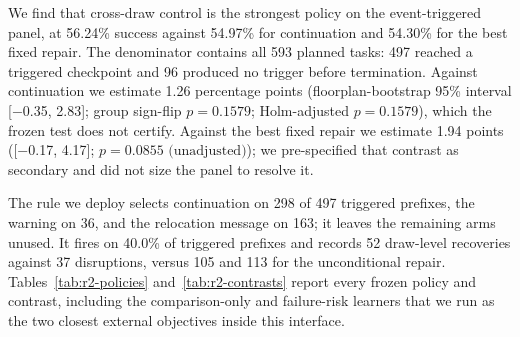 We find that cross-draw control is the strongest policy on the event-triggered panel, at 56.24\% success against 54.97\% for continuation and 54.30\% for the best fixed repair. The denominator contains all 593 planned tasks: 497 reached a triggered checkpoint and 96 produced no trigger before termination. Against continuation we estimate 1.26 percentage points (floorplan-bootstrap 95\% interval [$-$0.35, 2.83]; group sign-flip $p=0.1579$; Holm-adjusted $p=0.1579$), which the frozen test does not certify. Against the best fixed repair we estimate 1.94 points ([$-$0.17, 4.17]; $p=0.0855\text{ (unadjusted)}$); we pre-specified that contrast as secondary and did not size the panel to resolve it.

The rule we deploy selects continuation on 298 of 497 triggered prefixes, the warning on 36, and the relocation message on 163; it leaves the remaining arms unused. It fires on 40.0\% of triggered prefixes and records 52 draw-level recoveries against 37 disruptions, versus 105 and 113 for the unconditional repair. Tables~\ref{tab:r2-policies} and~\ref{tab:r2-contrasts} report every frozen policy and contrast, including the comparison-only and failure-risk learners that we run as the two closest external objectives inside this interface.

